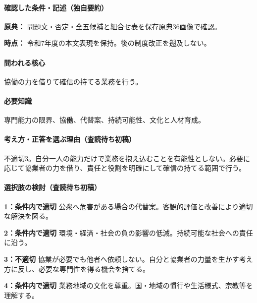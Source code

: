 \paragraph{確認した条件・記述（独自要約）}\mbox{}\par

\noindent\textbf{原典：} 問題文・否定・全五候補と組合せ表を保存原典36画像で確認。\par

\noindent\textbf{時点：} 令和7年度の本文表現を保持。後の制度改正を遡及しない。\par

\paragraph{問われる核心} 協働の力を借りて確信の持てる業務を行う。

\paragraph{必要知識} 専門能力の限界、協働、代替案、持続可能性、文化と人材育成。

\paragraph{考え方・正答を選ぶ理由（査読待ち初稿）} 不適切3。自分一人の能力だけで業務を抱え込むことを有能性としない。必要に応じて協業者の力を借り、責任と役割を明確にして確信の持てる範囲で行う。

\paragraph{選択肢の検討（査読待ち初稿）}\mbox{}\par

\noindent\textbf{1：条件内で適切} 公衆へ危害がある場合の代替案。客観的評価と改善により適切な解決を図る。\par

\noindent\textbf{2：条件内で適切} 環境・経済・社会の負の影響の低減。持続可能な社会への責任に沿う。\par

\noindent\textbf{3：不適切} 協業が必要でも他者へ依頼しない。自分と協業者の力量を生かす考え方に反し、必要な専門性を得る機会を捨てる。\par

\noindent\textbf{4：条件内で適切} 業務地域の文化を尊重。国・地域の慣行や生活様式、宗教等を理解する。\par

